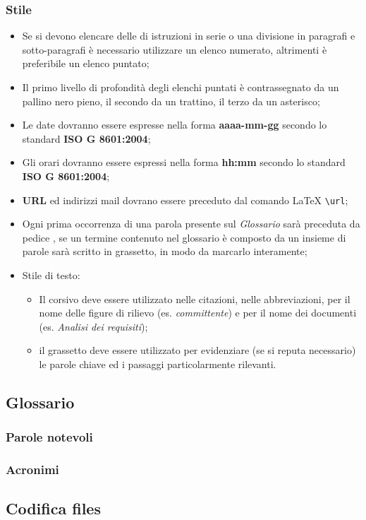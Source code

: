 \subsubsection{Stile}
\begin{itemize}
\item Se si devono elencare delle di istruzioni in serie o una divisione in paragrafi e sotto-paragrafi è necessario utilizzare un elenco numerato, altrimenti è preferibile un elenco puntato;

\item Il primo livello di profondità degli elenchi puntati è contrassegnato da un pallino nero pieno, il secondo da un trattino, il terzo da un asterisco;

\item Le date dovranno essere espresse nella forma \textbf{aaaa-mm-gg} secondo lo standard  \textbf{ISO G 8601:2004};

\item Gli orari dovranno essere espressi nella forma \textbf{hh:mm} secondo lo standard \textbf{ISO G 8601:2004};

\item \textbf{URL} ed indirizzi mail dovrano essere preceduto dal comando \LaTeX{} \verb!\url!;

\item Ogni prima occorrenza di una parola presente sul \textit{Glossario} sarà preceduta da pedice , se un termine contenuto nel glossario è composto da un insieme di parole sarà scritto in grassetto, in modo da marcarlo interamente;

\item Stile di testo:

\begin{itemize}

\item Il corsivo deve essere utilizzato nelle citazioni, nelle abbreviazioni, per il nome delle figure di rilievo (es. \textit{committente}) e per il nome dei documenti (es. \textit{Analisi dei requisiti});

\item il grassetto deve essere utilizzato per evidenziare (se si reputa necessario) le parole chiave ed i passaggi particolarmente rilevanti.

\end{itemize}

\end{itemize}

\subsection{Glossario}
\subsubsection{Parole notevoli}
\subsubsection{Acronimi}
\subsection{Codifica files}